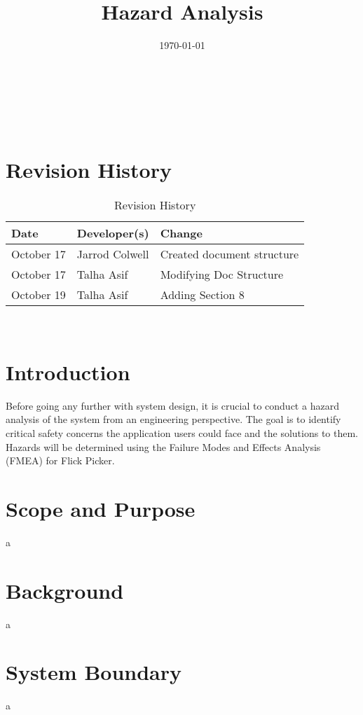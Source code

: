 \documentclass[12pt]{article}
\title{Hazard Analysis\\\progname}
\author{\authname}
\date{\today}
\begin{document}
\maketitle

~\newpage {}

\tableofcontents

~\newpage

\section*{Revision History}
\begin{table}[hp]
	\caption{Revision History} \label{TblRevisionHistory}
	\begin{tabularx}{\textwidth}{llX}
		\toprule
		\textbf{Date} & \textbf{Developer(s)} & \textbf{Change}\\
		\midrule
		October 17 & Jarrod Colwell & Created document structure\\
		October 17 & Talha Asif & Modifying Doc Structure\\
		October 19 & Talha Asif & Adding Section 8\\
		\bottomrule
		\end{tabularx}
\end{table}

~\newpage {}

\section{Introduction}
Before going any further with system design, it is crucial to conduct a hazard analysis of the system from an engineering perspective. The goal is to identify critical safety concerns the application users could face and the solutions to them. Hazards will be determined using the Failure Modes and Effects Analysis (FMEA) for Flick Picker.

\section{Scope and Purpose}
a

\section{Background}
a

\section{System Boundary}
a
\end{document}
